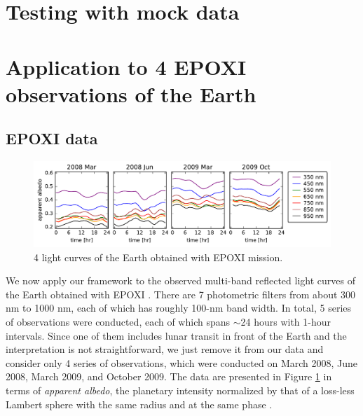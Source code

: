 \documentclass[iop,numberedappendix,apj,]{emulateapj}
\begin{document}
\section{Testing with mock data}
\label{s:mockdata}

\newpage

\section{Application to 4 EPOXI observations of the Earth}
\label{s:epoxi}

\subsection{EPOXI data}
\label{ss:epoxidata}

\begin{figure}[!tb]
    \begin{center}
\includegraphics[width=\hsize]{EPOXI_vislightcurve_4obs.pdf}
    \end{center}
    \caption{4 light curves of the Earth obtained with EPOXI mission.}
\label{fig:EPOXIlc}
\end{figure}

We now apply our framework to the observed multi-band reflected light curves of the Earth obtained with EPOXI \citep{Livengood2011, Cowan2011}. 
There are 7 photometric filters from about 300 nm to 1000 nm, each of which has roughly 100-nm band width. 
In total, 5 series of observations were conducted, each of which spans $\sim $24 hours with 1-hour intervals. 
Since one of them includes lunar transit in front of the Earth and the interpretation is not straightforward, we just remove it from our data and consider only 4 series of observations, which were conducted on March 2008, June 2008, March 2009, and October 2009. 
The data are presented in Figure \ref{fig:EPOXIlc} in terms of {\it apparent albedo}, the planetary intensity normalized by that of a loss-less Lambert sphere with the same radius and at the same phase \citep{Qiu2003, Seager2010}. 
\end{document}
